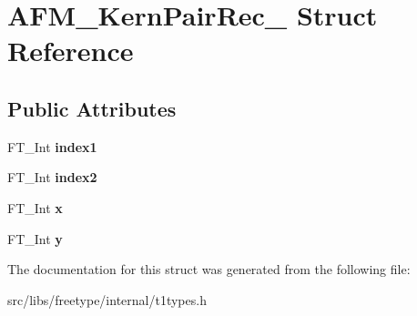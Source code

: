 \hypertarget{struct_a_f_m___kern_pair_rec__}{
\section{AFM\_\-KernPairRec\_\- Struct Reference}
\label{struct_a_f_m___kern_pair_rec__}
}
\subsection*{Public Attributes}
\begin{DoxyCompactItemize}
\item 
\hypertarget{struct_a_f_m___kern_pair_rec___a732bca56dd4a070b1d887ada1637e810}{
FT\_\-Int {\bfseries index1}}
\label{struct_a_f_m___kern_pair_rec___a732bca56dd4a070b1d887ada1637e810}

\item 
\hypertarget{struct_a_f_m___kern_pair_rec___aee548123779323c255180112c7f5b831}{
FT\_\-Int {\bfseries index2}}
\label{struct_a_f_m___kern_pair_rec___aee548123779323c255180112c7f5b831}

\item 
\hypertarget{struct_a_f_m___kern_pair_rec___a4b7f90a0e17ed89353fec14ddb29fa12}{
FT\_\-Int {\bfseries x}}
\label{struct_a_f_m___kern_pair_rec___a4b7f90a0e17ed89353fec14ddb29fa12}

\item 
\hypertarget{struct_a_f_m___kern_pair_rec___aa177aa612e79701261eba72c76ea3f08}{
FT\_\-Int {\bfseries y}}
\label{struct_a_f_m___kern_pair_rec___aa177aa612e79701261eba72c76ea3f08}

\end{DoxyCompactItemize}


The documentation for this struct was generated from the following file:\begin{DoxyCompactItemize}
\item 
src/libs/freetype/internal/t1types.h\end{DoxyCompactItemize}
